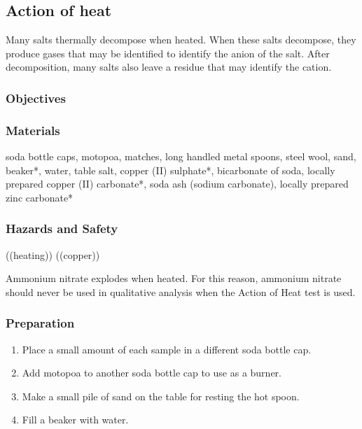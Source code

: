 \subsection{Action of heat}

Many salts thermally decompose when heated. When these salts decompose, they produce gases that may be identified to identify the anion of the salt. After decomposition, many salts also leave a residue that may identify the cation.

\subsubsection{Objectives}


\subsubsection{Materials}
soda bottle caps, motopoa, matches, long handled metal spoons, steel wool, sand, beaker*, water, table salt, copper (II) sulphate*, bicarbonate of soda, locally prepared copper (II) carbonate*, soda ash (sodium carbonate), locally prepared zinc carbonate*


\subsubsection{Hazards and Safety}
((heating))
((copper))

Ammonium nitrate explodes when heated. For this reason, ammonium nitrate should never be used in qualitative analysis when the Action of Heat test is used.

\subsubsection{Preparation}
\begin{enumerate}
\item{Place a small amount of each sample in a different soda bottle cap.}
\item{Add motopoa to another soda bottle cap to use as a burner.}
\item{Make a small pile of sand on the table for resting the hot spoon.}
\item{Fill a beaker with water.}
\end{enumerate}

